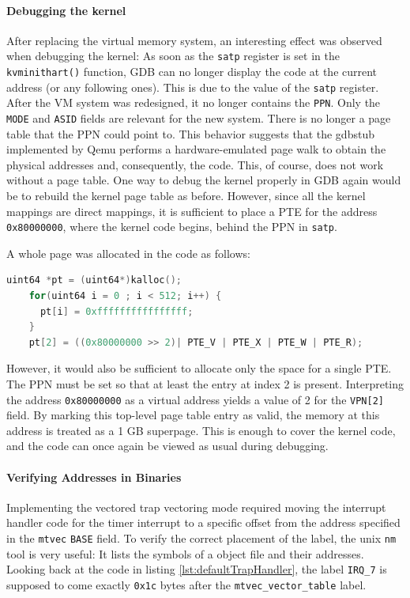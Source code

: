 \paragraph{Debugging the kernel} After replacing the virtual memory system, an interesting effect was observed when debugging the kernel: As soon as the \texttt{satp} register is set in the \texttt{kvminithart()} function, GDB can no longer display the code at the current address (or any following ones). This is due to the value of the \texttt{satp} register. After the VM system was redesigned, it no longer contains the \texttt{PPN}. Only the \texttt{MODE} and \texttt{ASID} fields are relevant for the new system. There is no longer a page table that the PPN could point to. This behavior suggests that the gdbstub implemented by Qemu performs a hardware-emulated page walk to obtain the physical addresses and, consequently, the code. This, of course, does not work without a page table. One way to debug the kernel properly in GDB again would be to rebuild the kernel page table as before. However, since all the kernel mappings are direct mappings, it is sufficient to place a PTE for the address \texttt{0x80000000}, where the kernel code begins, behind the PPN in \texttt{satp}.

A whole page was allocated in the code as follows:
\begin{lstlisting}[language=c,float=h!, label={lst:fake_pt}]
    uint64 *pt = (uint64*)kalloc();
    for(uint64 i = 0 ; i < 512; i++) {
      pt[i] = 0xffffffffffffffff;
    }
    pt[2] = ((0x80000000 >> 2)| PTE_V | PTE_X | PTE_W | PTE_R);
\end{lstlisting}
However, it would also be sufficient to allocate only the space for a single PTE. The PPN must be set so that at least the entry at index 2 is present. Interpreting the address \texttt{0x80000000} as a virtual address yields a value of 2 for the \texttt{VPN[2]} field. By marking this top-level page table entry as valid, the memory at this address is treated as a 1 GB superpage. This is enough to cover the kernel code, and the code can once again be viewed as usual during debugging.

\paragraph{Verifying Addresses in Binaries} Implementing the vectored trap vectoring mode
required moving the interrupt handler code for the timer interrupt to a specific offset
from the address specified in the \texttt{mtvec} \texttt{BASE} field.
To verify the correct placement of the label, the unix \texttt{nm} tool is very useful:
It lists the symbols of a object file and their addresses.
Looking back at the code in listing \ref{lst:defaultTrapHandler}, the label \texttt{IRQ\_7}
is supposed to come exactly \texttt{0x1c} bytes after the \texttt{mtvec\_vector\_table} label.

